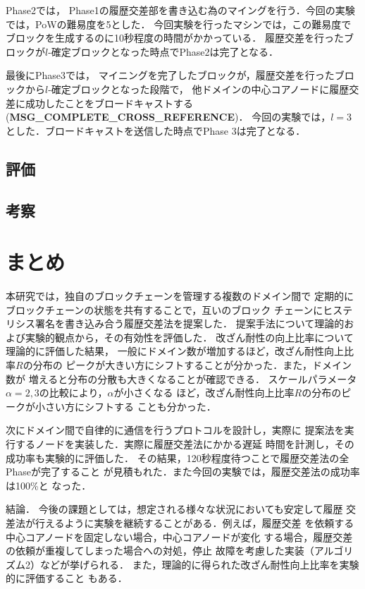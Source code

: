 \documentclass[a4paper,12pt]{jsarticle}
\begin{document}
Phase2では，
Phase1の履歴交差部を書き込む為のマイングを行う．今回の実験では，PoWの難易度を5とした．
今回実験を行ったマシンでは，この難易度でブロックを生成するのに10秒程度の時間がかかっている．
履歴交差を行ったブロックが$l$-確定ブロックとなった時点でPhase2は完了となる．

最後にPhase3では，
マイニングを完了したブロックが，履歴交差を行ったブロックから$l$-確定ブロックとなった段階で，
他ドメインの中心コアノードに履歴交差に成功したことをブロードキャストする
 (\textbf{MSG\_COMPLETE\_CROSS\_REFERENCE})．
今回の実験では，$l=3$とした．ブロードキャストを送信した時点でPhase 3は完了となる．

\subsection{評価}
\subsection{考察}
\newpage
\section{まとめ}
本研究では，独自のブロックチェーンを管理する複数のドメイン間で
定期的にブロックチェーンの状態を共有することで，互いのブロック
チェーンにヒステリシス署名を書き込み合う履歴交差法を提案した．
提案手法について理論的および実験的観点から，その有効性を評価した．
改ざん耐性の向上比率について理論的に評価した結果，
一般にドメイン数が増加するほど，改ざん耐性向上比率$R$の分布の
ピークが大きい方にシフトすることが分かった．また，ドメイン数が
増えると分布の分散も大きくなることが確認できる．
スケールパラメータ$\alpha=2,3$の比較により，$\alpha$が小さくなる
ほど，改ざん耐性向上比率$R$の分布のピークが小さい方にシフトする
ことも分かった．

次にドメイン間で自律的に通信を行うプロトコルを設計し，実際に
提案法を実行するノードを実装した．実際に履歴交差法にかかる遅延
時間を計測し，その成功率も実験的に評価した．
その結果，120秒程度待つことで履歴交差法の全Phaseが完了すること
が見積もれた．また今回の実験では，履歴交差法の成功率は100\%と
なった．




結論．
今後の課題としては，想定される様々な状況においても安定して履歴
交差法が行えるように実験を継続することがある．例えば，履歴交差
を依頼する中心コアノードを固定しない場合，中心コアノードが変化
する場合，履歴交差の依頼が重複してしまった場合への対処，停止
故障を考慮した実装（アルゴリズム2）などが挙げられる．
また，理論的に得られた改ざん耐性向上比率を実験的に評価すること
もある．
\end{document}
